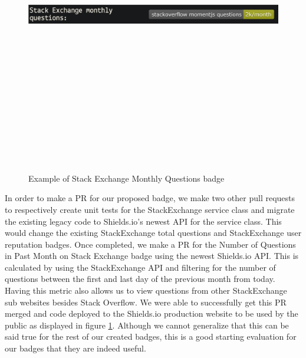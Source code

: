 \documentclass[12pt, letterpaper]{article}
\begin{document}
\begin{figure}[!htb]
    \centerline{
        \includegraphics[width=14cm,height=14cm,keepaspectratio=true]{semonthlybadge}
    }
    \caption{
        Example of Stack Exchange Monthly Questions badge
    }
    \label{semonthlybadge}
\end{figure}

In order to make a PR for our proposed badge, we make two other pull requests to respectively
create unit tests for the StackExchange service class and migrate the existing legacy code to Shields.io's newest
API for the service class. This would change the existing StackExchange total questions and StackExchange
user reputation badges. Once completed, we make a PR for the Number of Questions in Past Month on Stack Exchange
badge using the newest Shields.io API. This is calculated by using the StackExchange API and filtering for the 
number of questions between the first and last day of the previous month from today. Having this metric also
allows us to view questions from other StackExchange sub websites besides Stack Overflow.
We were able to successfully get this PR merged and code deployed to the Shields.io \cite{shields} 
production website to be used by the public as displayed in figure \ref{semonthlybadge}. Although we cannot generalize that this can be said
true for the rest of our created badges, this is a good starting evaluation for our badges
that they are indeed useful. 
\end{document}
